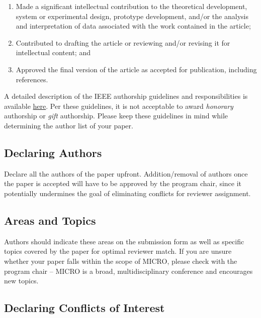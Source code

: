 \documentclass{sig-alternate}
\begin{document}
\begin{enumerate}

\item Made a significant intellectual contribution to the theoretical
  development, system or experimental design, prototype development,
  and/or the analysis and interpretation of data associated with the
  work contained in the article;

\item Contributed to drafting the article or reviewing and/or revising
  it for intellectual content; and

\item Approved the final version of the article as accepted for
  publication, including references.

\end{enumerate}

A detailed description of the IEEE authorship guidelines and
responsibilities is available
\href{https://www.ieee.org/publications_standards/publications/rights/Section821.html}{here}.
Per these guidelines, it is not acceptable to award {\em honorary }
authorship or {\em gift} authorship. Please keep these guidelines in
mind while determining the author list of your paper.


\subsection{Declaring Authors}

Declare all the authors of the paper upfront. Addition/removal of authors
once the paper is accepted will have to be approved by the program chair,
since it potentially undermines the goal of eliminating conflicts for
reviewer assignment.


\subsection{Areas and Topics}

Authors should indicate these areas on the submission form as
well as specific topics covered by the paper for optimal reviewer match. If
you are unsure whether your paper falls within the scope of MICRO, please
check with the program chair -- MICRO is a broad, multidisciplinary
conference and encourages new topics.

\subsection{Declaring Conflicts of Interest}
\end{document}
